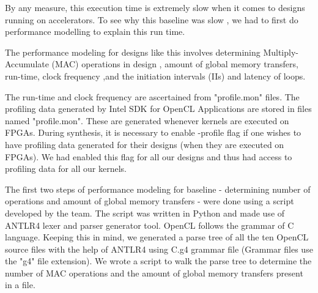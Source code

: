 By any measure, this execution time is extremely slow when it comes to designs running on accelerators. To see why this baseline was slow , we had to first do performance modelling to explain this run time.

The performance modeling for designs like this involves determining
  Multiply-Accumulate (MAC) operations in design , amount of global memory transfers, run-time, clock frequency ,and the initiation intervals (IIs) and latency of loops.

The run-time and clock frequency are ascertained from "profile.mon" files.   
The profiling data generated by Intel SDK for OpenCL Applications are stored in files named "profile.mon". These are generated whenever kernels are executed on FPGAs. During synthesis, it is necessary to enable -profile flag if one wishes to have profiling data generated for their designs (when they are executed on FPGAs). We had enabled this flag for all our designs and thus had access to profiling data for all our kernels.

The first two steps of performance modeling for baseline - determining number of operations and amount of global memory transfers - were done using a script developed by the team. The script was written in Python and made use of ANTLR4 lexer and parser generator tool. OpenCL follows the grammar of C language. Keeping this in mind, we generated a parse tree of all the ten OpenCL source files with the help of ANTLR4 using C.g4 grammar file (Grammar files use the "g4" file extension). We wrote a script to walk the parse tree to determine the number of MAC operations and the amount of global memory transfers present in a file.

